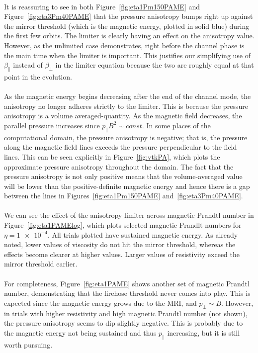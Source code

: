 \\
It is reassuring to see in both Figure~\ref{fig:eta1Pm150PAME} and Figure~\ref{fig:eta3Pm40PAME} that the pressure anisotropy bumps right up against the mirror threshold (which is the magnetic energy, plotted in solid blue) during the first few orbits. The limiter is clearly having an effect on the anisotropy value. However, as the unlimited case demonstrates, right before the channel phase is the main time when the limiter is important. This justifies our simplifying use of $\beta_\parallel$ instead of $\beta_\perp$ in the limiter equation because the two are roughly equal at that point in the evolution.\\
\\
As the magnetic energy begins decreasing after the end of the channel mode, the anisotropy no longer adheres strictly to the limiter. This is because the pressure anisotropy is a volume averaged-quantity. As the magnetic field decreases, the parallel pressure increases since $p_\parallel B^2\sim const$. In some places of the computational domain, the pressure anisotropy is negative; that is, the pressure along the magnetic field lines exceeds the pressure perpendicular to the field lines. This can be seen explicitly in Figure~\ref{fig:vtkPA}, which plots the approximate pressure anisotropy throughout the domain. The fact that the pressure anisotropy is not only positive means that the volume-averaged value will be lower than the positive-definite magnetic energy and hence there is a gap between the lines in Figures~\ref{fig:eta1Pm150PAME} and~\ref{fig:eta3Pm40PAME}. \\
\\
We can see the effect of the anisotropy limiter across magnetic Prandtl number in Figure~\ref{fig:eta1PAMElog}, which plots selected magnetic Prandlt numbers for $\eta=\num{1e-4}$. All trials plotted have sustained magnetic energy. As already noted, lower values of viscosity do not hit the mirror threshold, whereas the effects become clearer at higher values. Larger values of resistivity exceed the mirror threshold earlier.\\
\\
For completeness, Figure~\ref{fig:eta1PAME} shows another set of magnetic Prandtl number, demonstrating that the firehose threshold never comes into play. This is expected since the magnetic energy grows due to the MRI, and $p_\perp\sim B$. However, in trials with higher resistivity and high magnetic Prandtl number (not shown), the pressure anisotropy seems to dip slightly negative. This is probably due to the magnetic energy not being sustained and thus $p_\parallel$ increasing, but it is still worth pursuing. 




